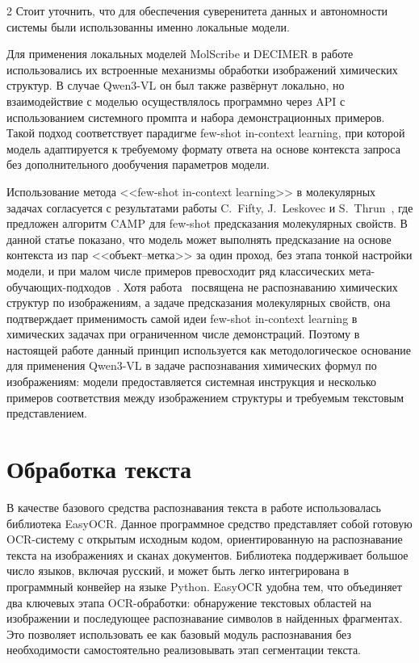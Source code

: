 \documentclass[11pt]{article}
\begin{document}
\begin{multicols}{2}
Стоит уточнить, что для обеспечения суверенитета данных и автономности системы были использованны именно локальные модели.

Для применения локальных моделей MolScribe и DECIMER в работе использовались их встроенные механизмы обработки изображений химических структур. В случае Qwen3-VL он был также развёрнут локально, но взаимодействие с моделью осуществлялось программно через API с использованием системного промпта и набора демонстрационных примеров. Такой подход соответствует парадигме few-shot in-context learning, при которой модель адаптируется к требуемому формату ответа на основе контекста запроса без дополнительного дообучения параметров модели.

Использование метода <<few-shot in-context learning>> в молекулярных задачах согласуется с результатами работы C.~Fifty, J.~Leskovec и S.~Thrun~\cite{refCAMP}, где предложен алгоритм CAMP для few-shot предсказания молекулярных свойств. В данной статье показано, что модель может выполнять предсказание на основе контекста из пар <<объект--метка>> за один проход, без этапа тонкой настройки модели, и при малом числе примеров превосходит ряд классических мета-обучающих-подходов~\cite{refCAMP}. Хотя работа~\cite{refCAMP} посвящена не распознаванию химических структур по изображениям, а задаче предсказания молекулярных свойств, она подтверждает применимость самой идеи few-shot in-context learning в химических задачах при ограниченном числе демонстраций. Поэтому в настоящей работе данный принцип используется как методологическое основание для применения Qwen3-VL в задаче распознавания химических формул по изображениям: модели предоставляется системная инструкция и несколько примеров соответствия между изображением структуры и требуемым текстовым представлением.
 
\section{Обработка текста}
В качестве базового средства распознавания текста в работе использовалась библиотека EasyOCR. Данное программное средство представляет собой готовую OCR-систему с открытым исходным кодом, ориентированную на распознавание текста на изображениях и сканах документов. Библиотека поддерживает большое число языков, включая русский, и может быть легко интегрирована в программный конвейер на языке Python. EasyOCR удобна тем, что объединяет два ключевых этапа OCR-обработки: обнаружение текстовых областей на изображении и последующее распознавание символов в найденных фрагментах. Это позволяет использовать ее как базовый модуль распознавания без необходимости самостоятельно реализовывать этап сегментации текста.


\end{multicols}
\end{document}
